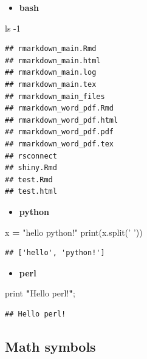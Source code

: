 \documentclass[]{article}
\newenvironment{Shaded}{\begin{snugshade}}{\end{snugshade}}
\newcommand{\BuiltInTok}[1]{#1}
\newcommand{\FunctionTok}[1]{\textcolor[rgb]{0.00,0.00,0.00}{#1}}
\newcommand{\KeywordTok}[1]{\textcolor[rgb]{0.13,0.29,0.53}{\textbf{#1}}}
\newcommand{\NormalTok}[1]{#1}
\newcommand{\OperatorTok}[1]{\textcolor[rgb]{0.81,0.36,0.00}{\textbf{#1}}}
\newcommand{\StringTok}[1]{\textcolor[rgb]{0.31,0.60,0.02}{#1}}
\providecommand{\tightlist}{%
  \setlength{\itemsep}{0pt}\setlength{\parskip}{0pt}}
\begin{document}
\begin{itemize}
\tightlist
\item
  \textbf{bash}
\end{itemize}

\begin{Shaded}
\begin{Highlighting}[]
\FunctionTok{ls}\NormalTok{ -1}
\end{Highlighting}
\end{Shaded}

\begin{verbatim}
## rmarkdown_main.Rmd
## rmarkdown_main.html
## rmarkdown_main.log
## rmarkdown_main.tex
## rmarkdown_main_files
## rmarkdown_word_pdf.Rmd
## rmarkdown_word_pdf.html
## rmarkdown_word_pdf.pdf
## rmarkdown_word_pdf.tex
## rsconnect
## shiny.Rmd
## test.Rmd
## test.html
\end{verbatim}

\begin{itemize}
\tightlist
\item
  \textbf{python}
\end{itemize}

\begin{Shaded}
\begin{Highlighting}[]
\NormalTok{x }\OperatorTok{=} \StringTok{"hello python!"}
\BuiltInTok{print}\NormalTok{(x.split(}\StringTok{' '}\NormalTok{))}
\end{Highlighting}
\end{Shaded}

\begin{verbatim}
## ['hello', 'python!']
\end{verbatim}

\begin{itemize}
\tightlist
\item
  \textbf{perl}
\end{itemize}

\begin{Shaded}
\begin{Highlighting}[]
\FunctionTok{print} \KeywordTok{"}\StringTok{Hello perl!}\KeywordTok{"}\NormalTok{;}
\end{Highlighting}
\end{Shaded}

\begin{verbatim}
## Hello perl!
\end{verbatim}

\hypertarget{math-symbols}{%
\subsection{Math symbols}\label{math-symbols}}
\end{document}
